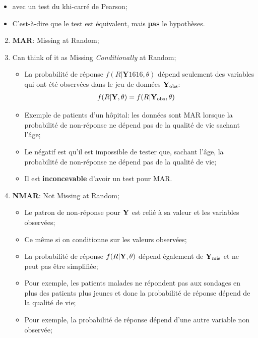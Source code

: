 \documentclass[10pt, french]{article}
\begin{document}
\begin{multicols*}{3}
\begin{enumerate}[leftmargin = *]
		\setlength{\mathindent}{1cm}
		\begin{itemize}[leftmargin = *]
		\item[]	avec un test du khi-carré de Pearson;
		\item[]	C'est-à-dire que le test est équivalent, mais \textbf{pas} le hypothèses.
		\end{itemize}	
\end{enumerate}
\begin{enumerate}[leftmargin = *]
	\setcounter{enumi}{1}
	\item	\textbf{MAR}: Missing at Random;
	\item[]	Can think of it as Missing \textit{Conditionally} at Random;
		\begin{itemize}[leftmargin = *]
		\item	La probabilité de réponse $f(R | \bm{Y}1616, \theta)$ dépend seulement des variables qui ont été observées dans le jeu de données $\mathbf{Y}_{\text{obs}}$:
			\begin{align*}
			f(R | \mathbf{Y}, \theta) &= f(R | \mathbf{Y}_{\text{obs}}, \theta) 
			\end{align*}
		\item	Exemple de patients d'un hôpital: les données sont MAR lorsque la probabilité de non-réponse ne dépend pas de la qualité de vie sachant l'âge;
		\item	Le négatif est qu'il est impossible de tester que, sachant l'âge, la probabilité de non-réponse ne dépend pas de la qualité de vie;
		\item	Il est \textbf{inconcevable} d'avoir un test pour MAR.
		\end{itemize}
	\item	\textbf{NMAR}: Not Missing at Random;
		\begin{itemize}[leftmargin = *]
		\item	Le patron de non-réponse pour $\mathbf{Y}$ est relié à sa valeur et les variables observées;
		\item[]	Ce même si on conditionne sur les valeurs observées;
		\item	La probabilité de réponse $f(R | \mathbf{Y}, \theta)$ dépend également de $\mathbf{Y}_{\text{mis}}$ et ne peut pas être simplifiée;
		\item	Pour exemple, les patients malades ne répondent pas aux sondages en plus des patients plus jeunes et donc la probabilité de réponse dépend de la qualité de vie;
		\item	Pour exemple, la probabilité de réponse dépend d'une autre variable non observée;
		\end{itemize}
\end{enumerate}


\end{multicols*}
\end{document}
